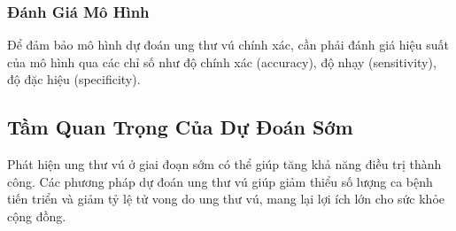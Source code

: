 \subsubsection{Đánh Giá Mô Hình}
Để đảm bảo mô hình dự đoán ung thư vú chính xác, cần phải đánh giá hiệu suất của mô hình qua các chỉ số như độ chính xác (accuracy), độ nhạy (sensitivity), độ đặc hiệu (specificity).

\subsection{Tầm Quan Trọng Của Dự Đoán Sớm}
Phát hiện ung thư vú ở giai đoạn sớm có thể giúp tăng khả năng điều trị thành công. Các phương pháp dự đoán ung thư vú giúp giảm thiểu số lượng ca bệnh tiến triển và giảm tỷ lệ tử vong do ung thư vú, mang lại lợi ích lớn cho sức khỏe cộng đồng.
